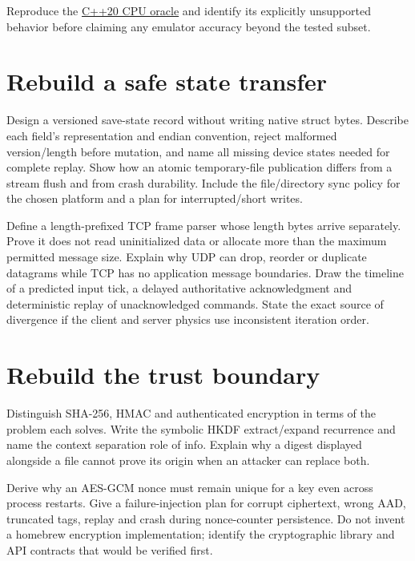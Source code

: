 Reproduce the \href{tools/labs/phase28_emulator_core_lab.cpp}{C++20 CPU oracle} and identify its explicitly unsupported behavior before claiming any emulator accuracy beyond the tested subset.

\section{Rebuild a safe state transfer}\label{appendix-11f73b337e37-rebuild-a-safe-state-transfer}

Design a versioned save-state record without writing native struct bytes. Describe each field's representation and endian convention, reject malformed version/length before mutation, and name all missing device states needed for complete replay. Show how an atomic temporary-file publication differs from a stream flush and from crash durability. Include the file/directory sync policy for the chosen platform and a plan for interrupted/short writes.

Define a length-prefixed TCP frame parser whose length bytes arrive separately. Prove it does not read uninitialized data or allocate more than the maximum permitted message size. Explain why UDP can drop, reorder or duplicate datagrams while TCP has no application message boundaries. Draw the timeline of a predicted input tick, a delayed authoritative acknowledgment and deterministic replay of unacknowledged commands. State the exact source of divergence if the client and server physics use inconsistent iteration order.

\section{Rebuild the trust boundary}\label{appendix-11f73b337e37-rebuild-the-trust-boundary}

Distinguish SHA-256, HMAC and authenticated encryption in terms of the problem each solves. Write the symbolic HKDF extract/expand recurrence and name the context separation role of info. Explain why a digest displayed alongside a file cannot prove its origin when an attacker can replace both.

Derive why an AES-GCM nonce must remain unique for a key even across process restarts. Give a failure-injection plan for corrupt ciphertext, wrong AAD, truncated tags, replay and crash during nonce-counter persistence. Do not invent a homebrew encryption implementation; identify the cryptographic library and API contracts that would be verified first.


